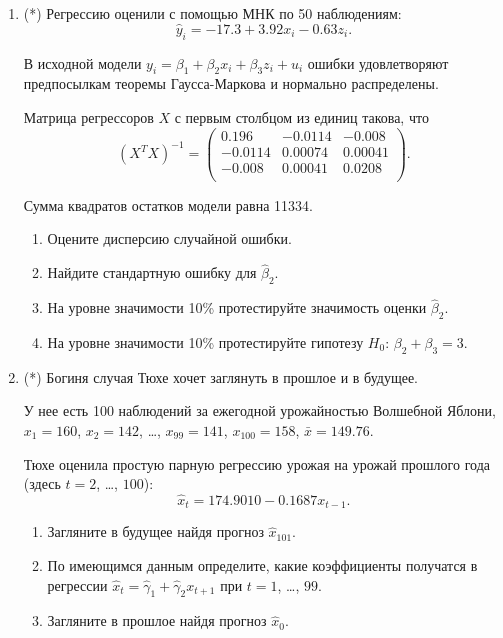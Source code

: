 \documentclass[12pt]{article}
\begin{document}
\begin{enumerate}
\newpage
    \item (*) Регрессию оценили с помощью МНК по 50 наблюдениям:
    \[
    \hat y_i = -17.3 + 3.92 x_i - 0.63 z_i.    
    \]

    В исходной модели $y_i = \beta_1 + \beta_2 x_i + \beta_3 z_i + u_i$ ошибки удовлетворяют 
    предпосылкам теоремы Гаусса-Маркова и нормально распределены.


    Матрица регрессоров $X$ с первым столбцом из единиц такова, что 
    \[
    (X^TX)^{-1} = \begin{pmatrix}
        0.196 & -0.0114 & -0.008 \\
        -0.0114 &  0.00074 & 0.00041 \\
        -0.008 & 0.00041 & 0.0208 \\
    \end{pmatrix}.    
    \]

    Сумма квадратов остатков модели равна 11334.

\begin{enumerate}
    \item Оцените дисперсию случайной ошибки.
    \item Найдите стандартную ошибку для $\hat\beta_2$.
    \item На уровне значимости 10\% протестируйте значимость оценки $\hat\beta_2$.
    \item На уровне значимости 10\% протестируйте гипотезу $H_0$: $\beta_2 + \beta_3 = 3$.
\end{enumerate}


\item (*) Богиня случая Тюхе хочет заглянуть в прошлое и в будущее. 

У нее есть 100 наблюдений за ежегодной урожайностью Волшебной Яблони,
$x_1 = 160$, $x_2 = 142$, \ldots, $x_{99} = 141$, $x_{100} = 158$, 
$\bar x = 149.76$. 

Тюхе оценила простую парную регрессию урожая на урожай прошлого года (здесь $t=2$, \ldots, $100$):
\[
\hat x_t = 174.9010 - 0.1687 x_{t-1}.
\]

\begin{enumerate}
    \item Загляните в будущее найдя прогноз $\hat x_{101}$.
    \item По имеющимся данным определите, какие коэффициенты получатся 
    в регрессии $\hat x_t = \hat\gamma_1 +\hat\gamma_2 x_{t+1}$ при $t=1$, \ldots, $99$.
    \item Загляните в прошлое найдя прогноз $\hat x_{0}$.
\end{enumerate}



\end{enumerate}
\end{document}
